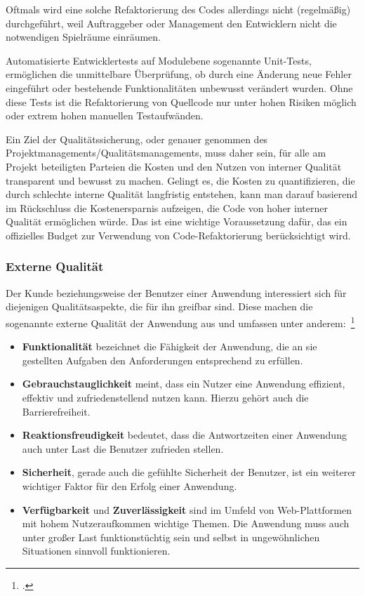 Oftmals wird eine solche Refaktorierung des Codes allerdings nicht (regelmäßig) durchgeführt, weil Auftraggeber oder Management den Entwicklern nicht die notwendigen Spielräume einräumen.

    Automatisierte Entwicklertests auf Modulebene sogenannte Unit-Tests, ermöglichen die unmittelbare Überprüfung, ob durch eine Änderung neue Fehler eingeführt oder bestehende Funktionalitäten unbewusst verändert wurden. Ohne diese Tests ist die Refaktorierung von Quellcode nur unter hohen Risiken möglich oder extrem hohen manuellen Testaufwänden.

Ein Ziel der Qualitätssicherung, oder genauer genommen des Projektmanagements/Qualitätsmanagements, muss daher sein, für alle am Projekt beteiligten Parteien die Kosten und den Nutzen von interner Qualität transparent und bewusst zu machen. Gelingt es, die Kosten zu quantifizieren, die durch schlechte interne Qualität langfristig entstehen, kann man darauf basierend im Rückschluss die Kostenersparnis aufzeigen, die Code von hoher interner Qualität ermöglichen würde. Das ist eine wichtige Voraussetzung dafür, das ein offizielles Budget zur Verwendung von Code-Refaktorierung berücksichtigt wird.

\subsubsection{Externe Qualität}
Der Kunde beziehungsweise der Benutzer einer Anwendung interessiert sich für diejenigen Qualitätsaspekte, die für ihn greifbar sind. Diese machen die sogenannte externe Qualität
der Anwendung aus und umfassen unter anderem:~\footcite[Vgl. Seite 5]{Bergmann.2013}
\begin{itemize}
    \item \textbf{Funktionalität} bezeichnet die Fähigkeit der Anwendung, die an sie gestellten Aufgaben den Anforderungen entsprechend zu erfüllen.
    
    \item \textbf{Gebrauchstauglichkeit} meint, dass ein Nutzer eine Anwendung effizient, effektiv und zufriedenstellend nutzen kann. Hierzu gehört auch die Barrierefreiheit.

    \item \textbf{Reaktionsfreudigkeit} bedeutet, dass die Antwortzeiten einer Anwendung auch unter Last die Benutzer zufrieden stellen. 

    \item \textbf{Sicherheit}, gerade auch die gefühlte Sicherheit der Benutzer, ist ein weiterer wichtiger Faktor für den Erfolg einer Anwendung.

    \item \textbf{Verfügbarkeit} und \textbf{Zuverlässigkeit} sind im Umfeld von Web-Plattformen mit hohem Nutzeraufkommen wichtige Themen. Die Anwendung muss auch unter großer Last funktionstüchtig sein und selbst in ungewöhnlichen Situationen sinnvoll funktionieren.
\end{itemize}

